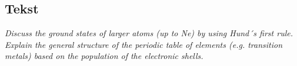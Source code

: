 \subsection{Tekst}

\emph{Discuss the ground states of larger atoms (up to Ne) by using Hund´s first rule. Explain the general structure of the periodic table of elements (e.g. transition metals) based on the population of the electronic shells.}